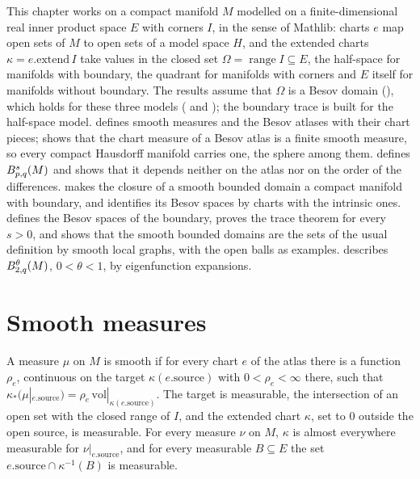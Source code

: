 This chapter works on a compact manifold $M$ modelled on a finite-dimensional real inner product
space $E$ with corners $I$, in the sense of Mathlib: charts $e$ map open sets of $M$ to open sets
of a model space $H$, and the extended charts $\kappa = e.\mathrm{extend}\, I$ take values in the
closed set $\Omega = \operatorname{range} I \subseteq E$, the half-space for manifolds with
boundary, the quadrant for manifolds with corners and $E$ itself for manifolds without boundary.
The results assume that $\Omega$ is a Besov domain (), which holds for these
three models ( and ); the
boundary trace is built for the half-space model.  defines smooth
measures and  the Besov atlases with their chart pieces;
 shows that the chart measure of a Besov atlas is a finite
smooth measure, so every compact Hausdorff manifold carries one, the sphere among them.
 defines $B^{s}_{p,q}(M)$ and shows that it depends neither on the
atlas nor on the order of the differences.  makes the closure of a
smooth bounded domain a compact manifold with boundary, and 
identifies its Besov spaces by charts with the intrinsic ones. 
defines the Besov spaces of the boundary,  proves the trace theorem for
every $s > 0$, and  shows that the smooth bounded domains are the
sets of the usual definition by smooth local graphs, with the open balls as examples.
 describes $B^{\theta}_{2,q}(M)$, $0 < \theta < 1$, by
eigenfunction expansions.

\section{Smooth measures}
\label{sec:smooth-measures}

\begin{definition}
\label{def:smooth-measure}
\leanok
A measure $\mu$ on $M$ is smooth if for every chart $e$ of the atlas there is a function $\rho_e$,
continuous on the target $\kappa(e.\mathrm{source})$ with $0 < \rho_e < \infty$ there, such that
$\kappa_* (\mu|_{e.\mathrm{source}}) = \rho_e \, \mathrm{vol}|_{\kappa(e.\mathrm{source})}$. The
target is measurable, the intersection of an open set with the closed range of $I$, and the
extended chart $\kappa$, set to $0$ outside the open source, is measurable. For every measure $\nu$
on $M$, $\kappa$ is almost everywhere measurable for $\nu|_{e.\mathrm{source}}$, and for every
measurable $B \subseteq E$ the set $e.\mathrm{source} \cap \kappa^{-1}(B)$ is measurable.
\end{definition}

